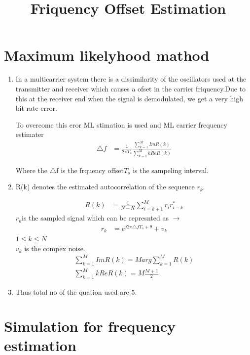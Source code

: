 \documentclass[journal,12pt,onecolumn]{IEEEtran}
\begin{document}
\title{Friquency Offset Estimation}
\maketitle
\section{Maximum likelyhood mathod}
\begin{enumerate}
	\item In a multicarrier  system  there is a dissimilarity of the oscillators used at the transmitter and receiver which  causes a ofset in the carrier friquency.Due to this at the receiver end when the signal is demodulated, we get a very high bit rate error.
	
	To overcome this eror ML stimation is used and ML carrier frequency estimater 
	\begin{align}
	\triangle f &= \frac{1}{2\pi T_s}\frac{\sum_{k=1}^{M} Im{R(k)}}{\sum_{k=1}^{M} kRe{R(k)}}
	\end{align}
	
	Where the  $\triangle$f is the frquency  offset$T_s$ is the sampeling interval.
	
	\item R(k) denotes the estimated autocorrelation of the sequence $r_k$.
	
	\begin{align}
	R(k) &= \frac{1}{N-K}{\sum_{i = k+1}^{M} r_ir_{i-k}^*}	
	\end{align}
	$r_k $is the sampled signal which can be represnted as $\to$
	\begin{align}
	r_k &= e^{j2\pi \triangle fT_s + \theta}	+ v_k
	\end{align}
	$1\leq k \leq N$
	\\
	$v_k$ is the compex noise.
	\\
   \begin{align}
    \sum_{k=1}^{M} Im{R(k)} = M arg{\sum_{k=1}^{M} {R(k)}}
    \\
    \sum_{k=1}^{M} kRe{R(k)} = M\frac{M+1}{2}
	\end{align}
	\item Thus total no of the quation used are 5.
\end{enumerate}

\section{Simulation for frequency estimation}
\end{document}
